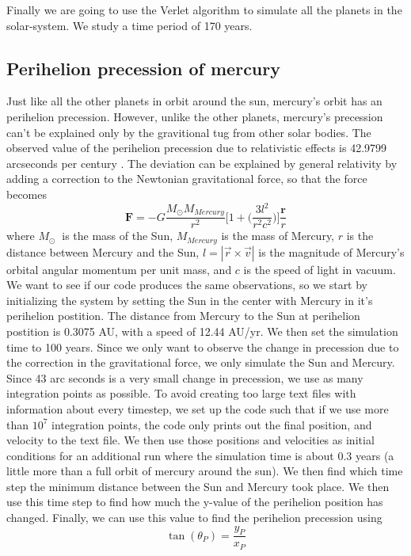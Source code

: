 \documentclass{article}
\begin{document}
\begin{multicols}{2}
Finally we are going to use the Verlet algorithm to simulate all the planets in the solar-system. We study a time period of 170 years. 

\subsection{Perihelion precession of mercury}

Just like all the other planets in orbit around the sun, mercury's orbit has an perihelion precession. However, unlike the other planets, mercury's precession can't be explained only by the gravitional tug from other solar bodies. The observed value of the perihelion precession due to relativistic effects is 42.9799 arcseconds per century \cite{97}. The deviation can be explained by general relativity by adding a correction to the Newtonian gravitational force, so that the force becomes
\begin{equation}
\mathbf{F}=-G\frac{M_{\odot}M_{Mercury}}{r^2}\Bigg[1+\Bigg(\frac{3l^2}{r^2c^2}\bigg)\bigg]\frac{\mathbf{r}}{r} \label{eq:relcor}
\end{equation}
where $M_\odot\ $ is the mass of the Sun, $M_{Mercury}$ is the mass of Mercury, $r$ is the distance between Mercury and the Sun, $l = |\vec{r} \times \vec{v}|$ is the magnitude of Mercury’s orbital angular momentum per unit mass, and $c$ is the speed of light in vacuum. We want to see if our code produces the same observations, so we start by initializing the system by setting the Sun in the center with Mercury in it's perihelion postition. The distance from Mercury to the Sun at perihelion postition is 0.3075 AU, with a speed of 12.44 AU/yr. We then set the simulation time to 100 years. Since we only want to observe the change in precession due to the correction in the gravitational force, we only simulate the Sun and Mercury. Since 43 arc seconds is a very small change in precession, we use as many integration points as possible. To avoid creating too large text files with information about every timestep, we set up the code such that if we use more than $10^7$ integration points, the code only prints out the final position, and velocity to the text file. We then use those positions and velocities as initial conditions for an additional run where the simulation time is about 0.3 years (a little more than a full orbit of mercury around the sun). We then find which time step the minimum distance between the Sun and Mercury took place. We then use this time step to find how much the y-value of the perihelion position has changed. Finally, we can use this value to find the perihelion precession using
\begin{equation}
\tan(\theta_P) = \frac{y_P}{x_P}
\end{equation}


\end{multicols}
\end{document}
